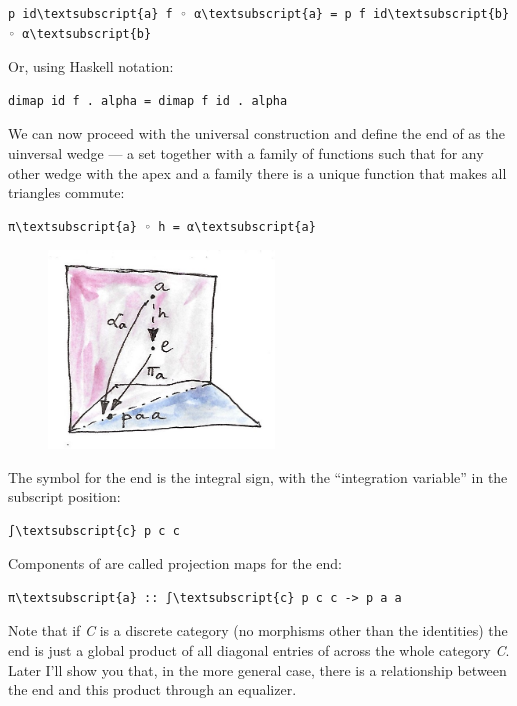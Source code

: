 \begin{Verbatim}[commandchars=\\\{\}]
p id\textsubscript{a} f ◦ α\textsubscript{a} = p f id\textsubscript{b} ◦ α\textsubscript{b}
\end{Verbatim}
Or, using Haskell notation:

\begin{Verbatim}[commandchars=\\\{\}]
dimap id f . alpha = dimap f id . alpha
\end{Verbatim}
We can now proceed with the universal construction and define the end of
 as the uinversal wedge --- a set  together with a
family of functions  such that for any other wedge with the
apex  and a family  there is a unique function
 that makes all triangles commute:

\begin{Verbatim}[commandchars=\\\{\}]
π\textsubscript{a} ◦ h = α\textsubscript{a}
\end{Verbatim}

\begin{figure}[H]
\centering
\includegraphics[width=60mm]{images/end-21.jpg}
\end{figure}

\noindent
The symbol for the end is the integral sign, with the ``integration
variable'' in the subscript position:

\begin{Verbatim}[commandchars=\\\{\}]
∫\textsubscript{c} p c c
\end{Verbatim}
Components of  are called projection maps for the end:

\begin{Verbatim}[commandchars=\\\{\}]
π\textsubscript{a} :: ∫\textsubscript{c} p c c -> p a a
\end{Verbatim}
Note that if \emph{C} is a discrete category (no morphisms other than
the identities) the end is just a global product of all diagonal entries
of  across the whole category \emph{C}. Later I'll show you
that, in the more general case, there is a relationship between the end
and this product through an equalizer.

